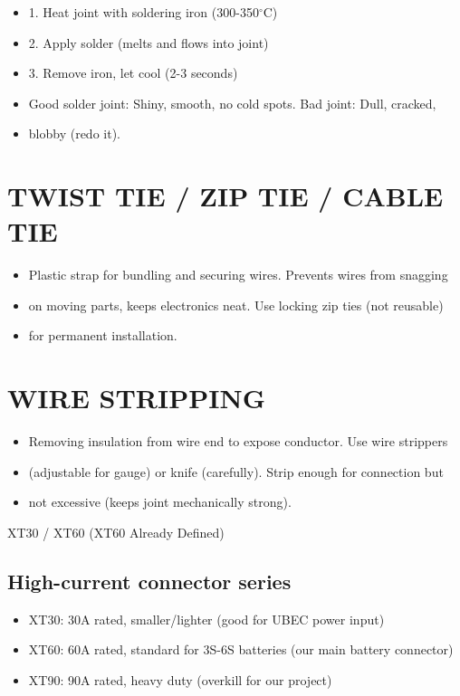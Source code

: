 \documentclass[11pt,letterpaper]{article}
\begin{document}
\begin{itemize}
  \item 1. Heat joint with soldering iron (300-350$^\circ$C)
  \item 2. Apply solder (melts and flows into joint)
  \item 3. Remove iron, let cool (2-3 seconds)
  \item Good solder joint: Shiny, smooth, no cold spots. Bad joint: Dull, cracked,
  \item blobby (redo it).
\end{itemize}

\section{TWIST TIE / ZIP TIE / CABLE TIE}

\begin{itemize}
  \item Plastic strap for bundling and securing wires. Prevents wires from snagging
  \item on moving parts, keeps electronics neat. Use locking zip ties (not reusable)
  \item for permanent installation.
\end{itemize}

\section{WIRE STRIPPING}

\begin{itemize}
  \item Removing insulation from wire end to expose conductor. Use wire strippers
  \item (adjustable for gauge) or knife (carefully). Strip enough for connection but
  \item not excessive (keeps joint mechanically strong).
\end{itemize}

XT30 / XT60 (XT60 Already Defined)\par

\subsection{High-current connector series}

\begin{itemize}
  \item XT30: 30A rated, smaller/lighter (good for UBEC power input)
  \item XT60: 60A rated, standard for 3S-6S batteries (our main battery connector)
  \item XT90: 90A rated, heavy duty (overkill for our project)
\end{itemize}
\end{document}
